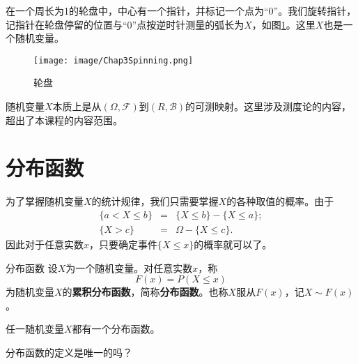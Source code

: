 \begin{example}
    在一个周长为1的轮盘中，中心有一个指针，并标记一个点为“0”。我们旋转指针，记指针在轮盘停留的位置与“0”点按逆时针测量的弧长为$X$，如图\ref{fig:chap03_spining}。这里$X$也是一个随机变量。
    \begin{figure}[ht]
        \centering
        \texttt{[image: image/Chap3Spinning.png]}
        \caption{轮盘}
        \label{fig:chap03_spining}
    \end{figure}
\end{example}

\begin{remark}
    随机变量$X$本质上是从$(\Omega,\mathcal{F})$到$(R,\mathcal{B})$的可测映射。这里涉及测度论的内容，超出了本课程的内容范围。
\end{remark}

\section{分布函数}

为了掌握随机变量$X$的统计规律，我们只需要掌握$X$的各种取值的概率。由于
\begin{eqnarray*}
    \{a<X\leq b\} &=& \{X\leq b\} - \{X \leq a\};\\
    \{X>c\} &=& \Omega - \{X \leq c\}.
\end{eqnarray*}
因此对于任意实数$x$，只要确定事件$\{X\leq x\}$的概率就可以了。

\begin{definition}{分布函数} \label{def: cdf} 
设$X$为一个随机变量。对任意实数$x$，称
$$
F(x) = P(X\leq x)
$$
为随机变量$X$的{\textbf{累积分布函数}}，简称{\textbf{分布函数}}。也称$X$服从$F(x)$，记$X\sim F(x)$。
\end{definition}
\begin{remark}
   任一随机变量$X$都有一个分布函数。
\end{remark}
\begin{problem}
   分布函数的定义是唯一的吗？
\end{problem}
\vspace{3cm}

